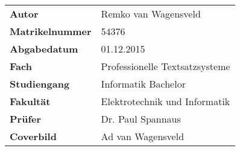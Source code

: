 \thispagestyle{empty}
\begin{bottompar}
	\begin{tabular}{ll}
		\textbf{Autor} & Remko van Wagensveld \\
		\textbf{Matrikelnummer} & 54376 \\
		\textbf{Abgabedatum} & 01.12.2015\\
		\textbf{Fach} & Professionelle Textsatzsysteme \\ 
		\textbf{Studiengang} & Informatik Bachelor \\
		\textbf{Fakultät} & Elektrotechnik und Informatik \\
		\textbf{Prüfer} & Dr. Paul Spannaus\\
		\textbf{Coverbild} & Ad van Wagensveld \cite{VW.2015}
	\end{tabular}	
\end{bottompar}
	
	
